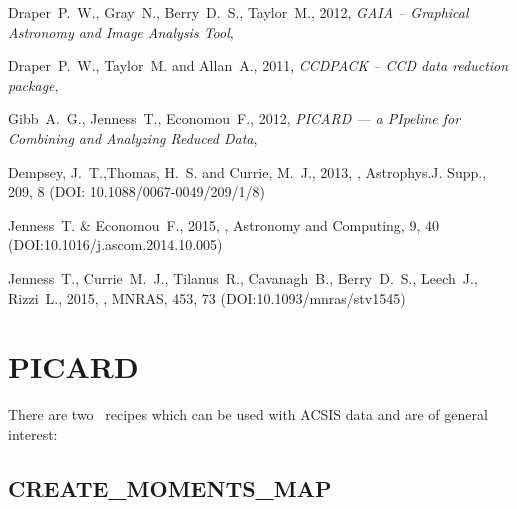 \documentclass[11pt,oneside,chapters]{starlink}
\begin{document}
\begin{thebibliography}{}
Draper~P.~W., Gray~N., Berry~D.~S., Taylor~M., 2012,
\textit{GAIA -- Graphical Astronomy and Image Analysis Tool},

Draper~P.~W., Taylor~M. and Allan~A., 2011, \textit{CCDPACK -- CCD data reduction package},

Gibb~A.~G., Jenness~T., Economou~F., 2012, \textit{PICARD --- a
PIpeline for Combining and Analyzing Reduced Data},

Dempsey, J.~T.,Thomas, H.~S. and Currie, M.~J., 2013,
, Astrophys.J. Supp., 209, 8
(DOI: 10.1088/0067-0049/209/1/8)

Jenness~T. \& Economou~F., 2015,
, Astronomy and
Computing, 9, 40 (DOI:10.1016/j.ascom.2014.10.005)

Jenness~T., Currie~M.~J., Tilanus~R., Cavanagh~B., Berry~D.~S.,
Leech~J., Rizzi~L., 2015, ,
MNRAS, 453, 73 (DOI:10.1093/mnras/stv1545)

\end{thebibliography}

\newpage
\appendix

\chapter{PICARD}
\label{app:picard}
There are two \picard\ recipes which can be used with ACSIS data and are of general interest:

\section{CREATE\_MOMENTS\_MAP}
\end{document}
